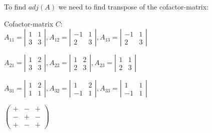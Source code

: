 \documentclass{article}
\begin{document}
To find $adj(A)$ we need to find transpose of the cofactor-matrix:

Cofactor-matrix $C$:\\
$A_{11}=
\left |
    \begin{matrix}
        1 & 1\\
        3 & 3
    \end{matrix}
\right |
, A_{12} =
\left |
    \begin{matrix}
        -1 & 1\\
        2 & 3
    \end{matrix}
\right |
, A_{13} =
\left |
    \begin{matrix}
        -1 & 1\\
        2 & 3
    \end{matrix}
\right |
$

$A_{21}=
\left |
    \begin{matrix}
        1 & 2\\
        3 & 3
    \end{matrix}
\right |
, A_{22}=
\left |
    \begin{matrix}
        1 & 2\\
        2 & 3
    \end{matrix}
\right |
, A_{23}=
\left |
    \begin{matrix}
        1 & 1\\
        2 & 3
    \end{matrix}
\right |
$

$A_{31}=
\left |
    \begin{matrix}
        1 & 2\\
        1 & 1
    \end{matrix}
\right |
, A_{32}=
\left |
    \begin{matrix}
        1 & 2\\
        -1 & 1
    \end{matrix}
\right |
, A_{33}=
\left |
    \begin{matrix}
        1 & 1\\
        -1 & 1
    \end{matrix}
\right |
$

$
\left (
    \begin{matrix}
        + & - & +\\
        - & + & -\\
        + & - & +
    \end{matrix}
\right )
$
\end{document}
